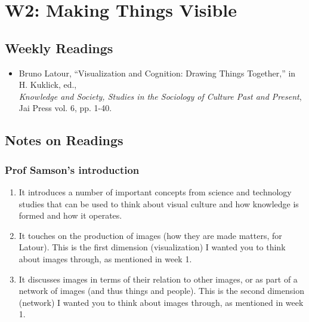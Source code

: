 \documentclass[a4paper]{article}
\begin{document}
\section{W2: Making Things Visible}
\subsection*{Weekly Readings}
\begin{itemize}
	\item Bruno Latour, ``Visualization and Cognition: Drawing Things Together,'' in H. Kuklick, ed.,\\ 
	\textit{Knowledge and Society, Studies in the Sociology of Culture Past and Present}, Jai Press vol. 6, pp. 1-40.
\end{itemize}

\subsection{Notes on Readings}
\subsubsection{Prof Samson's introduction}
\begin{enumerate}
	\item It introduces a number of important concepts from science and technology studies that can be used to think about visual culture and how knowledge is formed and how it operates.
	\item It touches on the production of images (how they are made matters, for Latour). This is the first dimension (visualization) I wanted you to think about images through, as mentioned in week 1.
	\item It discusses images in terms of their relation to other images, or as part of a network of images (and thus things and people). This is the second dimension (network) I wanted you to think about images through, as mentioned in week 1.
\end{enumerate}
\end{document}
